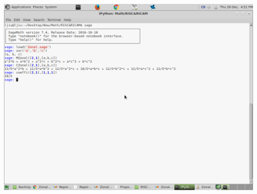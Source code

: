 \documentclass[10pt,oneside,american]{amsart}
\numberwithin{equation}{section}
\numberwithin{figure}{section}
\theoremstyle{plain}
\theoremstyle{definition}
\theoremstyle{remark}
\theoremstyle{plain}
\theoremstyle{definition}
\theoremstyle{plain}
\theoremstyle{plain}
\begin{document}
~

\includegraphics[scale=0.3]{ScreenShot}






\end{document}
